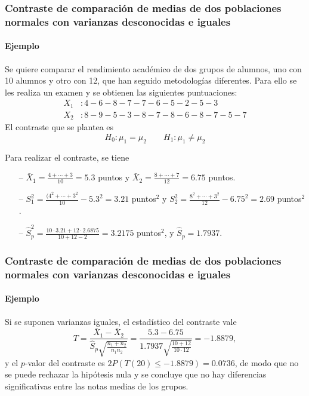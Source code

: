 \begin{frame}
\frametitle{Contraste de comparación de medias de dos poblaciones normales con varianzas desconocidas e iguales}
\framesubtitle{Ejemplo}
Se quiere comparar el rendimiento académico de dos grupos de alumnos, uno con 10 alumnos y otro con 12, que han
seguido metodologías diferentes. Para ello se les realiza un examen y se obtienen las siguientes puntuaciones:
\begin{align*}
X_1 &: 4 - 6 - 8 - 7 - 7 - 6 - 5 - 2 - 5 - 3 \\
X_2 &: 8 - 9 - 5 - 3 - 8 - 7 - 8 - 6 - 8 - 7 - 5 - 7  
\end{align*}
El contraste que se plantea es
\[ 
H_0: \mu_1=\mu_2\qquad H_1: \mu_1\neq \mu_2
\]

Para realizar el contraste, se tiene
\begin{itemize}
\item[--] $\bar{X}_1 = \frac{4+\cdots +3}{10}=5.3$ puntos y $\bar{X}_2=\frac{8+\cdots +7}{12}=6.75$ puntos.
\item[--] $S_1^2= \frac{(4^2+\cdots + 3^2}{10}-5.3^2=3.21$ puntos$^2$ y $S_2^2= \frac{8^2+\cdots +3^2}{12}-6.75^2=2.69$
puntos$^2$.
\item[--] $\hat{S}_p^2 = \frac{10\cdot 3.21+12\cdot 2.6875}{10+12-2}= 3.2175$ puntos$^2$, y $\hat S_p=1.7937$.
\end{itemize}
\end{frame}


\begin{frame}
\frametitle{Contraste de comparación de medias de dos poblaciones normales con varianzas desconocidas e iguales}
\framesubtitle{Ejemplo}
Si se suponen varianzas iguales, el estadístico del contraste vale
\[
T=\frac{\bar{X}_1-\bar{X}_2}{\hat{S}_p\sqrt{\frac{n_1+n_2}{n_1n_2}}} =
\frac{5.3-6.75}{1.7937\sqrt{\frac{10+12}{10\cdot 12}}} = -1.8879,
\]
y el $p$-valor del contraste es $2P(T(20)\leq -1.8879) = 0.0736$, de modo que no se puede rechazar la hipótesis
nula y se concluye que no hay diferencias significativas entre las notas medias de los grupos.
\end{frame}


